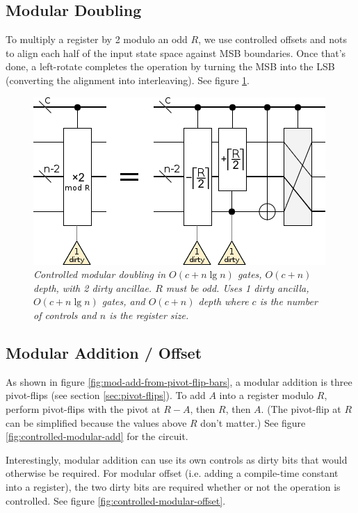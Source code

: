 \documentclass[twocolumn]{article}
\begin{document}
\subsection{Modular Doubling}

To multiply a register by 2 modulo an odd $R$, we use controlled offsets and nots to align each half of the input state space against MSB boundaries.
Once that's done, a left-rotate completes the operation by turning the MSB into the LSB (converting the alignment into interleaving).
See figure \ref{fig:modular-double}.

\begin{figure}
  \centering
  \includegraphics[width=\linewidth]{assets/controlled-modular-double.png}
  \caption{\em
    Controlled modular doubling in $O(c + n \lg n)$ gates, $O(c + n)$ depth, with 2 dirty ancillae.
    $R$ must be odd.
    Uses 1 dirty ancilla, $O(c + n \lg n)$ gates, and $O(c + n)$ depth where $c$ is the number of controls and $n$ is the register size.
  }
  \label{fig:modular-double}
\end{figure}


\subsection{Modular Addition / Offset}

As shown in figure \ref{fig:mod-add-from-pivot-flip-bars}, a modular addition is three pivot-flips (see section \ref{sec:pivot-flips}).
To add $A$ into a register modulo $R$, perform pivot-flips with the pivot at $R-A$, then $R$, then $A$.
(The pivot-flip at $R$ can be simplified because the values above $R$ don't matter.)
See figure \ref{fig:controlled-modular-add} for the circuit.

Interestingly, modular addition can use its own controls as dirty bits that would otherwise be required.
For modular offset (i.e. adding a compile-time constant into a register), the two dirty bits are required whether or not the operation is controlled.
See figure \ref{fig:controlled-modular-offset}.
\end{document}
